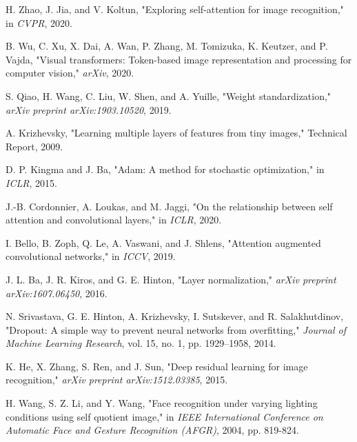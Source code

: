 \begin{thebibliography}{99}
        \item\label{ref18} H. Zhao, J. Jia, and V. Koltun, "Exploring self-attention for image recognition," in \emph{CVPR}, 2020.

        \item\label{ref19} B. Wu, C. Xu, X. Dai, A. Wan, P. Zhang, M. Tomizuka, K. Keutzer, and P. Vajda, "Visual transformers: Token-based image representation and processing for computer vision," \emph{arXiv}, 2020.
        
        \item\label{ref20} S. Qiao, H. Wang, C. Liu, W. Shen, and A. Yuille, "Weight standardization," \emph{arXiv preprint arXiv:1903.10520}, 2019.

        \item\label{ref21} A. Krizhevsky, "Learning multiple layers of features from tiny images," Technical Report, 2009.
        
        \item\label{ref22} D. P. Kingma and J. Ba, "Adam: A method for stochastic optimization," in \emph{ICLR}, 2015.
        
        \item\label{ref23} J.-B. Cordonnier, A. Loukas, and M. Jaggi, "On the relationship between self attention and convolutional layers," in \emph{ICLR}, 2020.
        
        \item\label{ref24} I. Bello, B. Zoph, Q. Le, A. Vaswani, and J. Shlens, "Attention augmented convolutional networks," in \emph{ICCV}, 2019.
        
        \item\label{ref25} J. L. Ba, J. R. Kiros, and G. E. Hinton, "Layer normalization," \emph{arXiv preprint arXiv:1607.06450}, 2016.
        
        \item\label{ref26} N. Srivastava, G. E. Hinton, A. Krizhevsky, I. Sutskever, and R. Salakhutdinov, "Dropout: A simple way to prevent neural networks from overfitting," \emph{Journal of Machine Learning Research}, vol. 15, no. 1, pp. 1929–1958, 2014.
        
        \item\label{ref27} K. He, X. Zhang, S. Ren, and J. Sun, "Deep residual learning for image recognition," \emph{arXiv preprint arXiv:1512.03385}, 2015.

        \item\label{ref27} H. Wang, S. Z. Li, and Y. Wang, "Face recognition under varying lighting conditions using self quotient image," in \emph{IEEE International Conference on Automatic Face and Gesture Recognition (AFGR)}, 2004, pp. 819-824.



\end{thebibliography}
